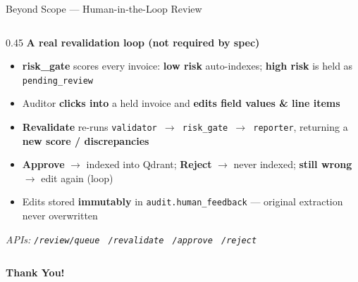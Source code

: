 \documentclass[aspectratio=169]{beamer}
\begin{document}
\begin{frame}{Beyond Scope --- Human-in-the-Loop Review}
\begin{columns}[T]
  \begin{column}{0.45\textwidth}
  \footnotesize
  \textbf{\color{brandblue}A real revalidation loop (not required by spec)}
  \begin{itemize}\setlength\itemsep{4pt}
    \item \textbf{risk\_gate} scores every invoice: \textbf{low risk} auto-indexes; \textbf{high risk} is held as \texttt{pending\_review}
    \item Auditor \textbf{clicks into} a held invoice and \textbf{edits field values \& line items}
    \item \textbf{Revalidate} re-runs \texttt{validator $\to$ risk\_gate $\to$ reporter}, returning a \textbf{new score / discrepancies}
    \item \textbf{Approve} $\to$ indexed into Qdrant; \textbf{Reject} $\to$ never indexed; \textbf{still wrong} $\to$ edit again (loop)
    \item Edits stored \textbf{immutably} in \texttt{audit.human\_feedback} --- original extraction never overwritten
  \end{itemize}
  \emph{\scriptsize APIs: \texttt{/review/queue} \textbullet\ \texttt{/revalidate} \textbullet\ \texttt{/approve} \textbullet\ \texttt{/reject}}
  \end{column}
  \end{columns}
\end{frame}

{
\begin{frame}[plain]

  \vfill
  \begin{center}
    {\color{white}\fontsize{60}{66}\selectfont\bfseries Thank You!}
  \end{center}
  \vfill
\end{frame}
}
\end{document}
